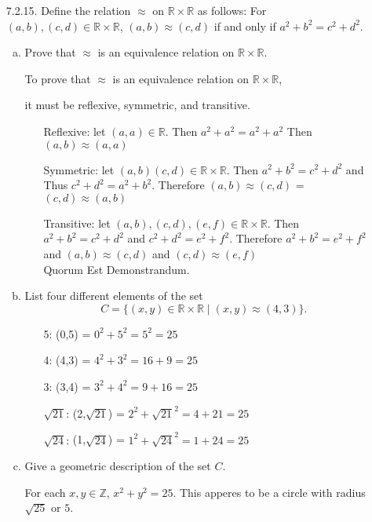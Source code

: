 \documentclass[11pt]{article}
\newcommand{\Z}{\mathbb Z}
\newcommand{\R}{\mathbb R}
\begin{document}
\begin{itemize}
\item[7.2.15.] Define the relation $\approx$ on $\R\times\R$ as follows: For $(a,b),(c,d)\in\R\times\R$, $(a,b)\approx(c,d)$ if and only if $a^2+b^2=c^2+d^2$.
\begin{enumerate}[(a)]
\item Prove that $\approx$ is an equivalence relation on $\R\times\R$.
\par To prove that $\approx$ is an equivalence relation on $\R\times\R$,
\par it must be reflexive, symmetric, and transitive.
\begin{enumerate}
    \item[Reflexive:] let $(a,a)\in \R$. Then $a^2+a^2=a^2+a^2$ Then $(a,b)\approx(a,a)$
    \item[Symmetric:] let $(a,b)(c,d)\in \R\times\R$. Then $a^2+b^2=c^2+d^2$ and Thus $c^2+d^2=a^2+b^2$.
                        Therefore $(a,b)\approx(c,d)$ = $(c,d)\approx(a,b)$
    \item[Transitive:] let $(a,b),(c,d),(e,f)\in \R\times\R$. Then $a^2+b^2=c^2+d^2$ and $c^2+d^2=e^2+f^2$.
                        Therefore $a^2+b^2=e^2+f^2$ and $(a,b)\approx(c,d)$ and $(c,d)\approx(e,f)$ \\
                        Quorum Est Demonstrandum.
\end{enumerate}
\item List four different elements of the set 
\[
C=\{(x,y)\in\R\times\R\mid(x,y)\approx (4,3)\}.
\]
\begin{center}
    \begin{enumerate}
        \item[5:] (0,5) = $0^2 + 5^2 = 5^2 = 25$
        \item[4:] (4,3) = $4^2 + 3^2 = 16 + 9 = 25$
        \item[3:] (3,4) = $3^2 + 4^2 = 9 + 16 = 25$
        \item[$\sqrt{21}$:] (2,$\sqrt{21}$) = $2^2 + \sqrt{21}^2 = 4 + 21 = 25$
        \item[$\sqrt{24}$:] (1,$\sqrt{24}$) = $1^2 + \sqrt{24}^2 = 1 + 24 = 25$
    \end{enumerate}
\end{center}
\item Give a geometric description of the set $C$.
\par For each $x,y\in\Z$, $x^2 + y^2 =25$. This apperes to be a circle with radius $\sqrt{25}$ or $5$.

\end{enumerate}


\end{itemize}
\end{document}
